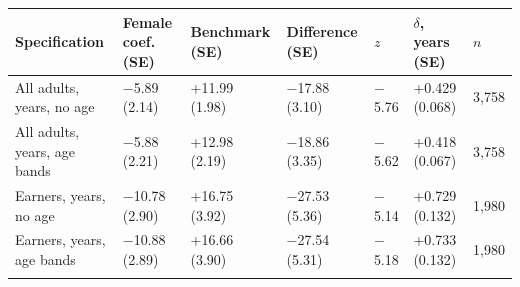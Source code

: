 \setlength{\tabcolsep}{2pt}
\begin{tabular}{@{}lllllll@{}}
\toprule
Specification & Female coef. (SE) & Benchmark (SE) & Difference (SE) & $z$ & $\delta$, years (SE) & $n$\\
\midrule
All adults, years, no age & $-$5.89 (2.14) & +11.99 (1.98) & $-$17.88 (3.10) & $-$5.76 & +0.429 (0.068) & 3,758\\
All adults, years, age bands & $-$5.88 (2.21) & +12.98 (2.19) & $-$18.86 (3.35) & $-$5.62 & +0.418 (0.067) & 3,758\\
Earners, years, no age & $-$10.78 (2.90) & +16.75 (3.92) & $-$27.53 (5.36) & $-$5.14 & +0.729 (0.132) & 1,980\\
Earners, years, age bands & $-$10.88 (2.89) & +16.66 (3.90) & $-$27.54 (5.31) & $-$5.18 & +0.733 (0.132) & 1,980\\
\botrule
\end{tabular}
